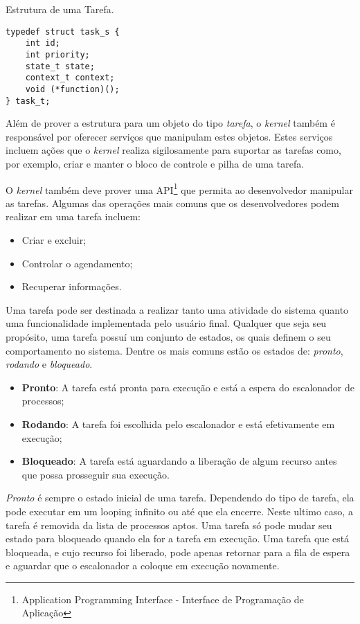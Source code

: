\begin{listing}
	\caption{Estrutura de uma Tarefa.}
	\label{alg:struct_task}
	\centering
	\begin{verbatim}
typedef struct task_s {
	int id;
	int priority;
	state_t state;
	context_t context;
	void (*function)();	
} task_t;
	\end{verbatim}
\end{listing}

Além de prover a estrutura para um objeto do tipo \emph{tarefa}, o \emph{kernel} também é responsável por oferecer serviços que manipulam estes objetos. Estes serviços incluem ações que o \emph{kernel} realiza sigilosamente para suportar as tarefas como, por exemplo, criar e manter o bloco de controle e pilha de uma tarefa.

O \emph{kernel} também deve prover uma API\footnote{Application Programming Interface - Interface de Programação de Aplicação} que permita ao desenvolvedor manipular as tarefas. Algumas das operações mais comuns que os desenvolvedores podem realizar em uma tarefa incluem:

\begin{itemize}
	\item Criar e excluir;
	\item Controlar o agendamento;
	\item Recuperar informações.
\end{itemize}

Uma tarefa pode ser destinada a realizar tanto uma atividade do sistema quanto uma funcionalidade implementada pelo usuário final. Qualquer que seja seu propósito, uma tarefa possuí um conjunto de estados, os quais definem o seu comportamento no sistema. Dentre os mais comuns estão os estados de: \emph{pronto}, \emph{rodando} e \emph{bloqueado}.

\begin{itemize}
	\item \textbf{Pronto}: A tarefa está pronta para execução e está a espera do escalonador de processos;
	\item \textbf{Rodando}: A tarefa foi escolhida pelo escalonador e está efetivamente em execução;
	\item \textbf{Bloqueado}: A tarefa está aguardando a liberação de algum recurso antes que possa prosseguir sua execução.
\end{itemize}

\emph{Pronto} é  sempre o estado inicial de uma tarefa. Dependendo do tipo de tarefa, ela pode executar em um looping infinito ou até que ela encerre. Neste ultimo caso, a tarefa é removida da lista de processos aptos. Uma tarefa só pode mudar seu estado para bloqueado quando ela for a tarefa em execução. Uma tarefa que está bloqueada, e cujo recurso foi liberado, pode apenas retornar para a fila de espera e aguardar que o escalonador a coloque em execução novamente.

